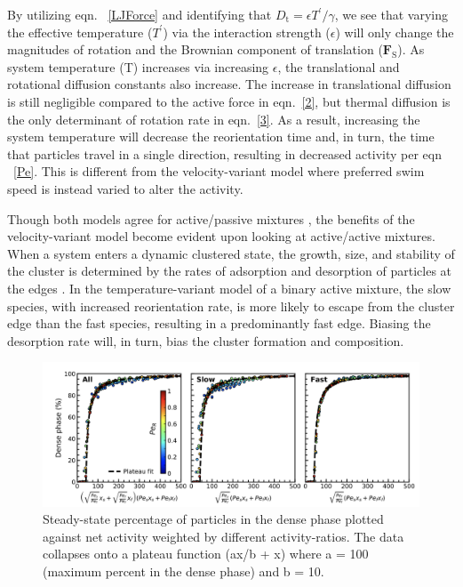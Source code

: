 \documentclass[11pt]{article}
\begin{document}
By utilizing eqn. ~\ref{LJForce} and identifying that $D_\text{t}=\epsilon T^\prime/\gamma$, we see that varying the effective temperature ($T^\prime$) via the interaction strength ($\epsilon$) will only change the magnitudes of rotation and the Brownian component of translation ($\boldsymbol{F}_\text{S}$).  As system temperature (T) increases via increasing $\epsilon$, the translational and rotational diffusion constants also increase.  The increase in translational diffusion is still negligible compared to the active force in eqn.~\ref{2}, but thermal diffusion is the only determinant of rotation rate in eqn.~\ref{3}.  As a result, increasing the system temperature will decrease the reorientation time and, in turn, the time that particles travel in a single direction, resulting in decreased activity per eqn ~\ref{Pe}.  This is different from the velocity-variant model where preferred swim speed is instead varied to alter the activity.  

Though both models agree for active/passive mixtures \cite{Stenhammar2}, the benefits of the velocity-variant model become evident upon looking at active/active mixtures.  When a system enters a dynamic clustered state, the growth, size, and stability of the cluster is determined by the rates of adsorption and desorption of particles at the edges \cite{Redner, Redner2}.  In the temperature-variant model of a binary active mixture, the slow species, with increased reorientation rate, is more likely to escape from the cluster edge than the fast species, resulting in a predominantly fast edge.  Biasing the desorption rate will, in turn, bias the cluster formation and composition.

\begin{figure}[ht]
\centering\includegraphics[width=1.0\linewidth]{Screen Shot 2020-08-10 at 12.35.19 PM.png}
\caption{Steady-state percentage of particles in the dense phase plotted against net activity weighted by different activity-ratios. The data collapses onto a plateau function (ax/b + x) where a = 100 (maximum percent in the dense phase) and b = 10. \cite{Kolb}}
\label{fig:netpe}
\end{figure}
\end{document}
